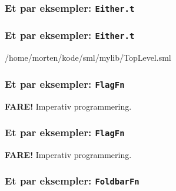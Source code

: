 \documentclass[slidestop,compress,mathserif, xcolor=table]{beamer}
\begin{document}
\begin{frame}
  \frametitle{Et par eksempler: \texttt{Either.t}}

  \begin{block}{}
    
  \end{block}
\end{frame}

\begin{frame}
  \frametitle{Et par eksempler: \texttt{Either.t}}

  \begin{block}{}
    
  \end{block}
  \begin{block}{}
    
    {/home/morten/kode/sml/mylib/TopLevel.sml}
  \end{block}
\end{frame}

\begin{frame}
  \frametitle{Et par eksempler: \texttt{FlagFn}}
  \textbf{FARE!} Imperativ programmering.

  \begin{block}{}
    
  \end{block}
  \begin{block}{}
    
  \end{block}
\end{frame}

\begin{frame}
  \frametitle{Et par eksempler: \texttt{FlagFn}}
  \textbf{FARE!} Imperativ programmering.

  \begin{block}{}
    
  \end{block}
\end{frame}

\begin{frame}
  \frametitle{Et par eksempler: \texttt{FoldbarFn}}

  \begin{block}{}
    
  \end{block}
  \begin{block}{}
    
  \end{block}
\end{frame}
\end{document}
